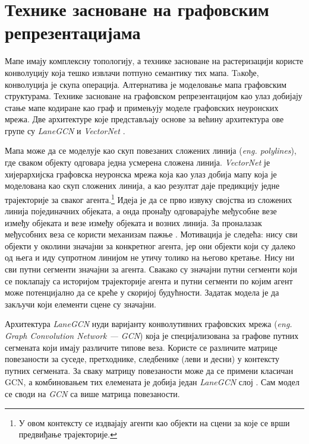 \documentclass[11pt,oneside]{memoir}
\begin{document}
\section{Технике засноване на графовским репрезентацијама}

Мапе имају комплексну топологију, а технике засноване на растеризацији користе конволуцију која тешко 
извлачи потпуно семантику тих мапа. Taкође, конволуција је скупа операција. Алтернатива је моделовање мапа графовским структурама. 
Технике засноване на графовском репрезентацијом као улаз добијају стање мапе кодиране као граф и примењују моделе графовских неуронских мрежа. 
Две архитектуре које представљају основе за већину архитектура ове групе су \textit{LaneGCN} \cite{lanegcn} и \textit{VectorNet} \cite{vectornet}.

Мапа може да се моделује као скуп повезаних сложених линија (\textit{eng. polylines}), где сваком објекту одговара једна усмерена сложена линија. 
\textit{VectorNet} је хијерархијска графовска неуронска мрежа која као улаз добија мапу која је моделована као скуп 
сложених линија, а као резултат даје предикцију једне трајекторије за сваког агента.\footnote{У овом контексту се издвајају агенти
као објекти на сцени за које се врши предвиђање трајекторије.} Идеја је да се прво извуку својства из сложених 
линија појединачних објеката, а онда пронађу одговарајуће међусобне везе између објеката и везе између објеката и возних линија. 
За проналазак међусобних веза се користи механизам пажње \cite{vectornet, attention_is_all_you_need}.
Мотивација је следећа: нису сви објекти у околини значајни за конкретног агента,
јер они објекти који су далеко од њега и иду супротном линијом не утичу толико на његово кретање. Нису ни сви путни сегменти значајни за агента.
Свакако су значајни путни сегменти који се поклапају са историјом трајекторије агента и путни сегменти по којим агент може потенцијално да се креће
у скоријој будућности. Задатак модела је да закључи који елементи сцене су значајни.

Архитектура \textit{LaneGCN} нуди варијанту конволутивних графовских мрежа (\textit{eng. Graph Convolution Network --- GCN}) \cite{gcn}
која је специјализована за графове путних сегмената који имају различите типове веза. Користе се различите матрице
повезаности за суседе, претходнике, следбенике (леви и десни) у контексту путних сегмената. 
За сваку матрицу повезаности може да се примени класичан GCN, а
комбиновањем тих елемената је добија један \textit{LaneGCN} слој \cite{lanegcn}. Сам модел се своди на \textit{GCN} са више матрица повезаности.
\end{document}
